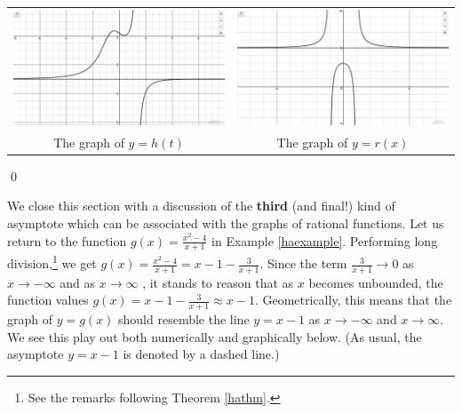 \documentclass{ximera}
\begin{document}
\begin{ex}
\begin{enumerate}
\begin{center}
\begin{tabular}{cc}
\includegraphics[width=3in]{./IntroRationalGraphics/HAEx03.jpg}  & \includegraphics[width=3in]{./IntroRationalGraphics/HAEx04.jpg} \\
The graph of $y=h(t)$  & The graph of $y=r(x)$ \\


\end{tabular}
\end{center} 

\end{enumerate}

\qed

\end{ex}


We close this section with a discussion of the \textbf{third} (and final!) kind of asymptote which can be associated with the graphs of rational functions. Let us return to the function $g(x) = \frac{x^2-4}{x+1}$ in Example \ref{haexample}. Performing long division,\footnote{See the remarks following Theorem \ref{hathm}.} we get $g(x) = \frac{x^2-4}{x+1} = x-1 - \frac{3}{x+1}$.  Since the term $\frac{3}{x+1} \rightarrow 0$ as $x \rightarrow - \infty$ and as $x \rightarrow  \infty$ , it stands to reason that as $x$ becomes unbounded, the function values   $g(x) = x-1 - \frac{3}{x+1} \approx x-1$.  Geometrically, this means that the graph of $y=g(x)$ should resemble the line $y = x-1$ as $x \rightarrow  -\infty$ and $x \rightarrow \infty$.  We see this play out both numerically and graphically below. (As usual, the asymptote $y = x-1$ is denoted by a dashed line.)
\end{document}
